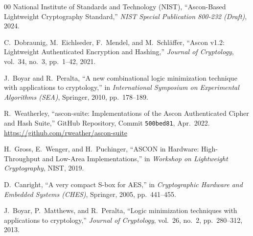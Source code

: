 \documentclass[journal,10pt]{IEEEtran}
\begin{document}
\begin{thebibliography}{00}
National Institute of Standards and Technology (NIST), ``Ascon-Based Lightweight Cryptography Standard,'' \emph{NIST Special Publication 800-232 (Draft)}, 2024.

C.~Dobraunig, M.~Eichlseder, F.~Mendel, and M.~Schl{\"a}ffer, ``Ascon v1.2: Lightweight Authenticated Encryption and Hashing,'' \emph{Journal of Cryptology}, vol.~34, no.~3, pp.~1--42, 2021.

J.~Boyar and R.~Peralta, ``A new combinational logic minimization technique with applications to cryptology,'' in \emph{International Symposium on Experimental Algorithms (SEA)}, Springer, 2010, pp.~178--189.

R.~Weatherley, ``ascon-suite: Implementations of the Ascon Authenticated Cipher and Hash Suite,'' GitHub Repository, Commit \texttt{500bed81}, Apr.~2022. \url{https://github.com/rweather/ascon-suite}

H.~Gross, E.~Wenger, and H.~Puchinger, ``ASCON in Hardware: High-Throughput and Low-Area Implementations,'' in \emph{Workshop on Lightweight Cryptography}, NIST, 2019.

D.~Canright, ``A very compact S-box for AES,'' in \emph{Cryptographic Hardware and Embedded Systems (CHES)}, Springer, 2005, pp.~441--455.

J.~Boyar, P.~Matthews, and R.~Peralta, ``Logic minimization techniques with applications to cryptology,'' \emph{Journal of Cryptology}, vol.~26, no.~2, pp.~280--312, 2013.
\end{thebibliography}
\end{document}

